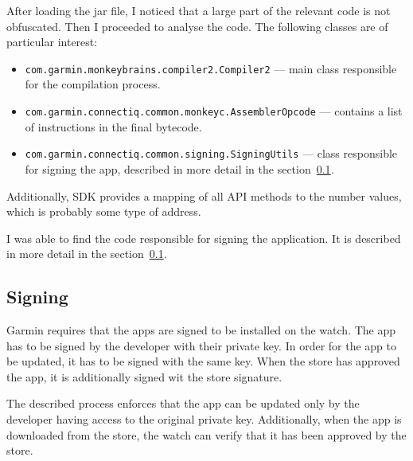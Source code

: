 After loading the jar file, I noticed that a large part of the relevant code is not obfuscated.
Then I proceeded to analyse the code.
The following classes are of particular interest:
\begin{itemize}
    \item \texttt{com.garmin.monkeybrains.compiler2.Compiler2} — main class responsible for the compilation process.
    \item \texttt{com.garmin.connectiq.common.monkeyc.AssemblerOpcode} — contains a list of instructions in the final bytecode.
    \item \texttt{com.garmin.connectiq.common.signing.SigningUtils} — class responsible for signing the app, described in more detail in the section~\ref{subsec:signing}.
\end{itemize}
Additionally, SDK provides a mapping of all API methods to the number values, which is probably some type of address.

I was able to find the code responsible for signing the application.
It is described in more detail in the section~\ref{subsec:signing}.

\subsection{Signing} \label{subsec:signing}
Garmin requires that the apps are signed to be installed on the watch\cite{garmin-signing}.
The app has to be signed by the developer with their private key.
In order for the app to be updated, it has to be signed with the same key.
When the store has approved the app, it is additionally signed wit the store signature.

The described process enforces that the app can be updated only by the developer having access to the original private key.
Additionally, when the app is downloaded from the store, the watch can verify that it has been approved by the store.

